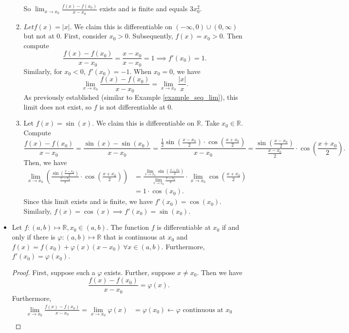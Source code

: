 \documentclass{article}
\newcommand{\R}{\mathbb{R}}
\newcommand{\?}{\stackrel{?}{=}}
\theoremstyle{definition} %
\begin{document}
\begin{itemize}
\begin{enumerate}[label=(\arabic*)]
        So $\lim_{x \to x_0} \frac{f(x) - f(x_0)}{x - x_0}$ exists and is finite and equals $3x_0^2$.
        \item $Let f(x) = |x|$. We claim this is differentiable on $(-\infty, 0) \cup (0, \infty)$ but not at 0. First, consider $x_0 > 0$. Subsequently, $f(x) = x_0 > 0$. Then compute
        $$\frac{f(x) - f(x_0)}{x - x_0} = \frac{x - x_0}{x - x_0} = 1 \implies f'(x_0) = 1.$$
        Similarly, for $x_0 < 0$, $f'(x_0) = -1$. When $x_0 = 0$, we have
        $$\lim_{x \to x_0} \frac{f(x) - f(x_0)}{x - x_0} = \lim_{x \to x_0 }\frac{|x|}{x}.$$
        As previously established (similar to Example \ref{example_seq_lim}), this limit does not exist, so $f$ is not differentiable at 0.
        \item Let $f(x) = \sin(x)$. We claim this is differentiable on $\R$. Take $x_0 \in \R$. Compute
        $$\frac{f(x) - f(x_0)}{x - x_0} = \frac{\sin(x) - \sin(x_0)}{x - x_0} = \frac{\frac{1}{2}\sin(\frac{x - x_0}{2}) \cdot \cos(\frac{x + x_0}{2})}{x - x_0} = \frac{\sin(\frac{x - x_0}{2})}{\frac{x - x_0}{2}} \cdot \cos(\frac{x + x_0}{2}).$$
        Then, we have
        \begin{align*}
            \lim_{x \to x_0} \left(\frac{\sin(\frac{x - x_0}{2})}{\frac{x - x_0}{2}} \cdot \cos\left(\frac{x + x_0}{2}\right)\right) &= \frac{\lim_{x \to x_0} \sin(\frac{x - x_0}{2})}{\lim_{x \to x_0} \frac{x - x_0}{2}} \cdot \lim_{x \to x_0} \cos(\frac{x + x_0}{2}) \\
            &= 1 \cdot \cos(x_0).
        \end{align*}
        Since this limit exists and is finite, we have $f'(x_0) = \cos(x_0)$. Similarly, $f(x) = \cos(x) \implies f'(x_0) = \sin(x_0)$.
    \end{enumerate}
    \item[]
    \begin{theorem}
        Let $f: (a, b) \mapsto \R, x_0 \in (a, b)$. The function $f$ is differentiable at $x_0$ if and only if there is $\varphi: (a, b) \mapsto \R$ that is continuous at $x_0$ and $f(x) = f(x_0) + \varphi(x)(x - x_0) \ \forall x \in (a, b)$. Furthermore, $f'(x_0) = \varphi(x_0)$.
    \end{theorem}
    \begin{proof}
        First, suppose such a $\varphi$ exists. Further, suppose $x \neq x_0$. Then we have
        $$\frac{f(x) - f(x_0)}{x - x_0} = \varphi(x).$$
        Furthermore,
        \begin{align*}
            \lim_{x \to x_0} \frac{f(x) - f(x_0)}{x - x_0} = \lim_{x \to x_0} \varphi(x) &= \varphi(x_0) \longleftarrow \varphi \text{ continuous at } x_0 \\

\end{align*}
\end{proof}
\end{itemize}
\end{document}
